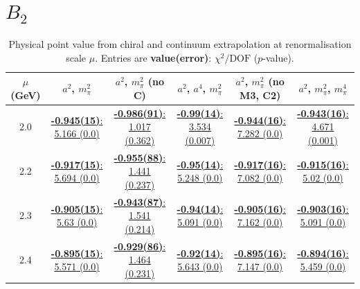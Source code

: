 \documentclass[12pt]{extarticle}
\begin{document}
\section{$B_2$}
\begin{table}[h!]
\begin{center}
\begin{tabular}{|c|c|c|c|c|c|}
\hline
$\mu$ (GeV) & $a^2$, $m_\pi^2$& $a^2$, $m_\pi^2$ (no C)& $a^2$, $a^4$, $m_\pi^2$& $a^2$, $m_\pi^2$ (no M3, C2)& $a^2$, $m_\pi^2$, $m_\pi^4$\\
\hline
2.0& \hyperlink{VVmAA/SUSY/a2m2_20.pdf.1}{\textbf{-0.945(15)}: 5.166 (0.0)} & \hyperlink{VVmAA/SUSY/a2m2noC_20.pdf.1}{\textbf{-0.986(91)}: 1.017 (0.362)} & \hyperlink{VVmAA/SUSY/a2a4m2_20.pdf.1}{\textbf{-0.99(14)}: 3.534 (0.007)} & \hyperlink{VVmAA/SUSY/a2m2mcut_20.pdf.1}{\textbf{-0.944(16)}: 7.282 (0.0)} & \hyperlink{VVmAA/SUSY/a2m2m4_20.pdf.1}{\textbf{-0.943(16)}: 4.671 (0.001)}\\
2.2& \hyperlink{VVmAA/SUSY/a2m2_22.pdf.1}{\textbf{-0.917(15)}: 5.694 (0.0)} & \hyperlink{VVmAA/SUSY/a2m2noC_22.pdf.1}{\textbf{-0.955(88)}: 1.441 (0.237)} & \hyperlink{VVmAA/SUSY/a2a4m2_22.pdf.1}{\textbf{-0.95(14)}: 5.248 (0.0)} & \hyperlink{VVmAA/SUSY/a2m2mcut_22.pdf.1}{\textbf{-0.917(16)}: 7.082 (0.0)} & \hyperlink{VVmAA/SUSY/a2m2m4_22.pdf.1}{\textbf{-0.915(16)}: 5.02 (0.0)}\\
2.3& \hyperlink{VVmAA/SUSY/a2m2_23.pdf.1}{\textbf{-0.905(15)}: 5.63 (0.0)} & \hyperlink{VVmAA/SUSY/a2m2noC_23.pdf.1}{\textbf{-0.943(87)}: 1.541 (0.214)} & \hyperlink{VVmAA/SUSY/a2a4m2_23.pdf.1}{\textbf{-0.94(14)}: 5.091 (0.0)} & \hyperlink{VVmAA/SUSY/a2m2mcut_23.pdf.1}{\textbf{-0.905(16)}: 7.162 (0.0)} & \hyperlink{VVmAA/SUSY/a2m2m4_23.pdf.1}{\textbf{-0.903(16)}: 5.091 (0.0)}\\
2.4& \hyperlink{VVmAA/SUSY/a2m2_24.pdf.1}{\textbf{-0.895(15)}: 5.571 (0.0)} & \hyperlink{VVmAA/SUSY/a2m2noC_24.pdf.1}{\textbf{-0.929(86)}: 1.464 (0.231)} & \hyperlink{VVmAA/SUSY/a2a4m2_24.pdf.1}{\textbf{-0.92(14)}: 5.643 (0.0)} & \hyperlink{VVmAA/SUSY/a2m2mcut_24.pdf.1}{\textbf{-0.895(16)}: 7.147 (0.0)} & \hyperlink{VVmAA/SUSY/a2m2m4_24.pdf.1}{\textbf{-0.894(16)}: 5.459 (0.0)}\\
\hline
\end{tabular}
\caption{Physical point value from chiral and continuum extrapolation at renormalisation scale $\mu$. Entries are \textbf{value(error)}: $\chi^2/\text{DOF}$ ($p$-value).}
\end{center}
\end{table}
\end{document}
